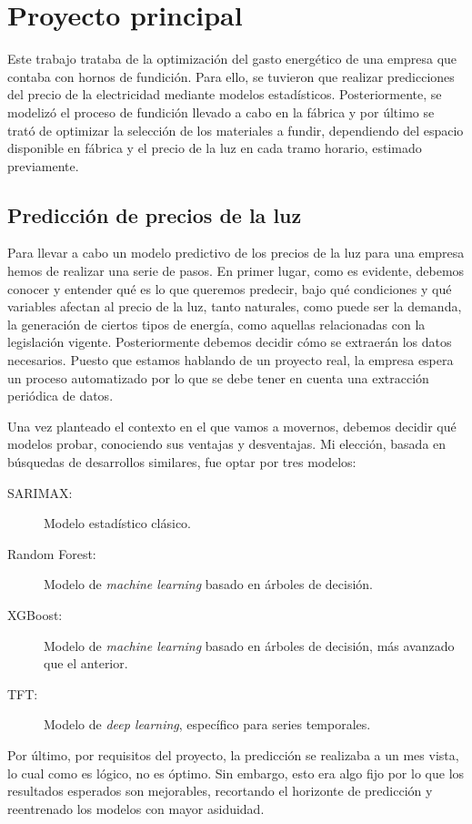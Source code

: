 \section{Proyecto principal}
%
%
Este trabajo trataba de la optimización del gasto energético de una empresa que contaba con hornos de fundición. Para ello, se tuvieron que realizar predicciones del precio de la electricidad mediante modelos estadísticos. Posteriormente, se modelizó el proceso de fundición llevado a cabo en la fábrica y por último se trató de optimizar la selección de los materiales a fundir, dependiendo del espacio disponible en fábrica y el precio de la luz en cada tramo horario, estimado previamente.
%
%
\subsection{Predicción de precios de la luz}
%
%
%
%
Para llevar a cabo un modelo predictivo de los precios de la luz para una empresa hemos de realizar una serie de pasos. En primer lugar, como es evidente, debemos conocer y entender qué es lo que queremos predecir, bajo qué condiciones y qué variables afectan al precio de la luz, tanto naturales, como puede ser la demanda, la generación de ciertos tipos de energía, como aquellas relacionadas con la legislación vigente. Posteriormente debemos decidir cómo se extraerán los datos necesarios. Puesto que estamos hablando de un proyecto real, la empresa espera un proceso automatizado por lo que se debe tener en cuenta una extracción periódica de datos.

Una vez planteado el contexto en el que vamos a movernos, debemos decidir qué modelos probar, conociendo sus ventajas y desventajas. Mi elección, basada en búsquedas de desarrollos similares, fue optar por tres modelos:
\begin{description}
    \item[SARIMAX:] Modelo estadístico clásico.
    \item[Random Forest:] Modelo de \textit{machine learning} basado en árboles de decisión.
    \item[XGBoost:] Modelo de \textit{machine learning} basado en árboles de decisión, más avanzado que el anterior.
    \item[TFT:] Modelo de \textit{deep learning}, específico para series temporales.
\end{description}

Por último, por requisitos del proyecto, la predicción se realizaba a un mes vista, lo cual como es lógico, no es óptimo. Sin embargo, esto era algo fijo por lo que los resultados esperados son mejorables, recortando el horizonte de predicción y reentrenado los modelos con mayor asiduidad.
%
%
%
